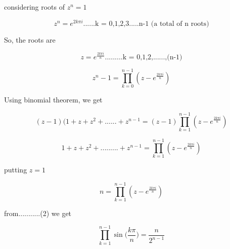 \documentclass[fleqn]{article}
\begin{document}
considering roots of $z^{n} = 1$

$$z^{n} = e^{2k\pi i}......\text{k = 0,1,2,3.....n-1 (a total of n roots)}$$

So, the roots are

$$z = e^{\frac{2k\pi i}{n}}.........\text{k = 0,1,2,......,(n-1)}$$

$$z^{n} - 1 = \prod_{k = 0}^{n-1}(z - e^{\frac{2k\pi i}{n}})$$

Using binomial theorem, we get

$$(z-1)(1+z+z^{2}+......+z^{n-1} = (z-1)\prod_{k = 1}^{n-1}(z - e^{\frac{2k\pi i}{n}})$$

$$1+z+z^{2}+.........+z^{n-1} = \prod_{k = 1}^{n-1}(z - e^{\frac{2k\pi i}{n}})$$

putting $z = 1$

$$n = \prod_{k = 1}^{n-1}(z - e^{\frac{2k\pi i}{n}})$$

from...........(2) we get

$$\prod_{k=1}^{n-1}\sin\bigg(\frac{k \pi}{n}\bigg) = \frac{n}{2^{n-1}}$$
\end{document}
